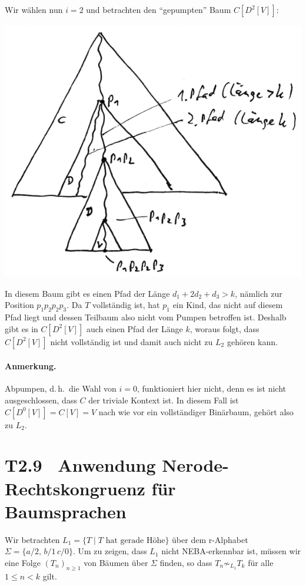\documentclass[fontsize=11pt, twoside=false, numbers=autoenddot]{scrbook}
\begin{document}
Wir wählen nun $i=2$ und betrachten den "`gepumpten"' Baum $C[D^2[V]]$:
%
\begin{center}
  \includegraphics[width=.5\linewidth]{img/t2_8c.pdf}%
\end{center}
%
In diesem Baum gibt es einen Pfad der Länge $d_1+2d_2+d_3 > k$, nämlich zur Position $p_1p_2p_2p_3$.
Da $T$ vollständig ist, hat $p_1$ ein Kind, das nicht auf diesem Pfad liegt und dessen Teilbaum
also nicht vom Pumpen betroffen ist.
Deshalb gibt es in $C[D^2[V]]$ auch einen Pfad der Länge $k$,
woraus folgt, dass $C[D^2[V]]$ nicht vollständig ist und damit auch nicht zu $L_2$ gehören kann.

\paragraph*{Anmerkung.} Abpumpen, d.\,h.\ die Wahl von $i=0$, funktioniert hier nicht,
denn es ist nicht ausgeschlossen, dass $C$ der triviale Kontext ist.
In diesem Fall ist $C[D^0[V]] = C[V] = V$ nach wie vor ein vollständiger Binärbaum,
gehört also zu $L_2$.

\section*{T2.9~ Anwendung Nerode-Rechtskongruenz für Baumsprachen}

Wir betrachten $L_1 = \{T \mid \text{$T$ hat gerade Höhe}\}$
über dem r-Alphabet $\Sigma = \{a/2,\,b/1\,c/0\}$.
Um zu zeigen, dass $L_1$ nicht NEBA-erkennbar ist,
müssen wir eine Folge $(T_n)_{n \geq 1}$ von Bäumen über $\Sigma$ finden,
so dass $T_n \not\sim_{L_1} T_k$ für alle $1 \leq n < k$ gilt.
\end{document}
